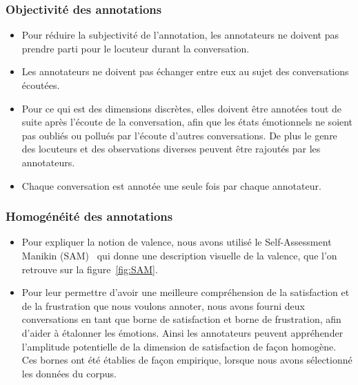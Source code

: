 \subsubsection{Objectivité des annotations}
\begin{itemize}
  \item Pour réduire la subjectivité de l'annotation, les annotateurs ne doivent pas prendre parti pour le locuteur durant la conversation.
  \item Les annotateurs ne doivent pas échanger entre eux au sujet des conversations écoutées.
  \item Pour ce qui est des dimensions discrètes, elles doivent être annotées tout de suite après l'écoute de la conversation, afin que les états émotionnels ne soient pas oubliés ou pollués par l'écoute d'autres conversations. De plus le genre des locuteurs et des observations diverses peuvent être rajoutés par les annotateurs.
  \item Chaque conversation est annotée une seule fois par chaque annotateur.
\end{itemize}

\subsubsection{Homogénéité des annotations}
\begin{itemize}
  \item Pour expliquer la notion de valence, nous avons utilisé le Self-Assessment Manikin (SAM)~\cite{Bradley1994} qui donne une description visuelle de la valence, que l'on retrouve sur la figure~\ref{fig:SAM}.
  \item Pour leur permettre d'avoir une meilleure compréhension de la satisfaction et de la frustration que nous voulons annoter, nous avons fourni deux conversations en tant que borne de satisfaction et borne de frustration, afin d'aider à étalonner les émotions. Ainsi les annotateurs peuvent appréhender l'amplitude potentielle de la dimension de satisfaction de façon homogène. Ces bornes ont été établies de façon empirique, lorsque nous avons sélectionné les données du corpus.
\end{itemize}





